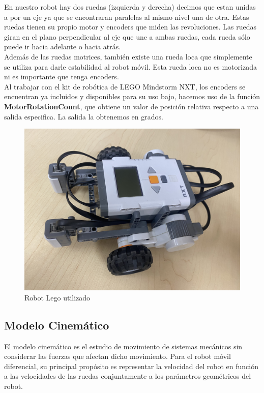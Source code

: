 \documentclass[oneside,twocolumn]{article}
\begin{document}
En nuestro robot hay dos ruedas (izquierda y derecha) decimos que estan unidas a por un eje ya que se encontraran paralelas al mismo nivel una de otra. Estas ruedas tienen su propio motor y encoders que miden las revoluciones. Las ruedas giran en el plano perpendicular al eje que une a ambas ruedas, cada rueda sólo puede ir hacia adelante o hacia atrás.\\

Además de las ruedas motrices, también existe una rueda loca que simplemente se utiliza para darle estabilidad al robot móvil. Esta rueda loca no es motorizada ni es importante que tenga encoders.\\

Al trabajar con el kit de robótica de LEGO Mindstorm NXT, los encoders se encuentran ya incluidos y disponibles para su uso bajo, hacemos uso de la función \textbf{MotorRotationCount}, que obtiene un valor de posición relativa respecto a una salida especifica. La salida la obtenemos en grados.

\begin{figure}[h]
  \centering
  \includegraphics[scale=0.1]{graficos/robot.png}
  \caption{Robot Lego utilizado}
\end{figure}


\subsection{Modelo Cinemático}

El modelo cinemático es el estudio de movimiento de sistemas mecánicos sin considerar las fuerzas que afectan dicho movimiento. Para el robot móvil diferencial, su principal propósito es representar la velocidad del robot en función a las velocidades de las ruedas conjuntamente a los parámetros geométricos del robot.\\
\end{document}
